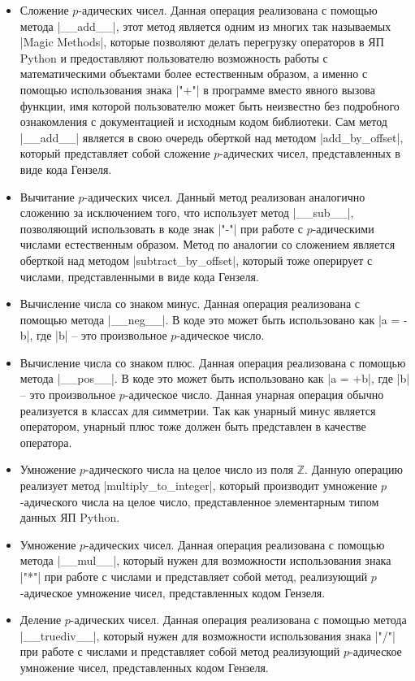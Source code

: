 \documentclass[master, och, diploma, times]{sty/SCWorks}
\theoremstyle{plain}
\theoremstyle{definition}
\numberwithin{equation}{section}
\begin{document}
\begin{itemize}
\item Сложение $p$-адических чисел. Данная операция реализована с помощью метода |__add__|, этот метод является одним из многих так называемых |Magic Methods|, которые позволяют делать перегрузку операторов в ЯП Python и предоставляют пользователю возможность работы с математическими объектами более естественным образом, а именно с помощью использования знака |"+"| в программе вместо явного вызова функции, имя которой пользователю может быть неизвестно без подробного ознакомления с документацией и исходным кодом библиотеки. Сам метод |__add__| является в свою очередь оберткой над методом |add_by_offset|, который представляет собой сложение $p$-адических чисел, представленных в виде кода Гензеля.
\item Вычитание $p$-адических чисел. Данный метод реализован аналогично сложению за исключением того, что использует метод |__sub__|, позволяющий использовать в коде знак |"-"| при работе с $p$-адическими числами естественным образом. Метод по аналогии со сложением является оберткой над методом |subtract_by_offset|, который тоже оперирует с числами, представленными в виде кода Гензеля.
\item Вычисление числа со знаком минус. Данная операция реализована с помощью метода |__neg__|. В коде это может быть использовано как |a = -b|, где |b| -- это произвольное $p$-адическое число.
\item Вычисление числа со знаком плюс. Данная операция реализована с помощью метода |__pos__|. В коде это может быть использовано как |a = +b|, где |b| -- это произвольное $p$-адическое число. Данная унарная операция обычно реализуется в классах для симметрии. Так как унарный минус является оператором, унарный плюс тоже должен быть представлен в качестве оператора.
\item Умножение $p$-адического числа на целое число из поля $\mathbb{Z}$. Данную операцию реализует метод |multiply_to_integer|, который производит умножение $p$-адического числа на целое число, представленное элементарным типом данных ЯП Python.
\item Умножение $p$-адических чисел. Данная операция реализована с помощью метода |__mul__|, который нужен для возможности использования знака |"*"| при работе с числами и представляет собой метод, реализующий $p$-адическое умножение чисел, представленных кодом Гензеля.
\item Деление $p$-адических чисел. Данная операция реализована с помощью метода |__truediv__|, который нужен для возможности использования знака |"/"| при работе с числами и представляет собой метод реализующий $p$-адическое умножение чисел, представленных кодом Гензеля.

\end{itemize}
\end{document}
